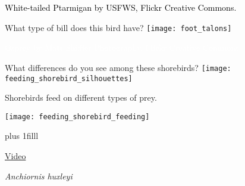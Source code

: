 {
\begin{frame}[b,plain]
	\tiny\textcolor{black}{White-tailed Ptarmigan by USFWS, Flickr Creative Commons.}
\end{frame}
}

{
\begin{frame}[c,plain]{What type of bill does this bird have?}
	\centering
	\texttt{[image: foot\_talons]}\par
\end{frame}
}

{
\begin{frame}[b,plain]
	\tiny\hfill\textcolor{white}{Osprey by Matt Shiffler Photography, Flickr Creative Commons.}
\end{frame}
}

{
\begin{frame}[t,plain]{What differences do you see among these shorebirds?}
	\centering
	\texttt{[image: feeding\_shorebird\_silhouettes]}\par
\end{frame}
}

{
\begin{frame}[t,plain]{Shorebirds feed on different types of prey.}
	\begin{center}
	\texttt{[image: feeding\_shorebird\_feeding]}\end{center}
\vskip0pt plus 1filll

\hfill\tiny\href{https://www.youtube.com/watch?v=56eU3KLIKZo}{Video}
\end{frame}
}



{
\begin{frame}[b,plain]
	\tiny\textit{Anchiornis huxleyi}
\end{frame}
}

